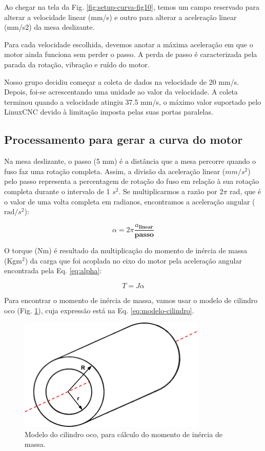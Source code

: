 Ao chegar na tela da Fig. \ref{fig:setup-curva-fig10}, temos um campo reservado para alterar a velocidade linear (mm/s) e outro para alterar a aceleração linear (mm/s2) da mesa deslizante.

Para cada velocidade escolhida, devemos anotar a máxima aceleração em que o motor ainda funciona sem perder o passo. A perda de passo é caracterizada pela parada da rotação, vibração e ruído do motor. 

Nosso grupo decidiu começar a coleta de dados na velocidade de 20 mm/s. Depois, foi-se acrescentando uma unidade ao valor da velocidade. A coleta terminou quando a velocidade atingiu 37.5 mm/s, o máximo valor suportado pelo LinuxCNC devido à limitação imposta pelas suas portas paralelas.


\subsection{Processamento para gerar a curva do motor}

Na mesa deslizante, o passo (5 mm) é a distância que a mesa percorre quando o fuso faz uma rotação completa. Assim, a divisão da aceleração linear ($mm/s^2$) pelo passo representa a percentagem de rotação do fuso em relação à sua rotação completa durante o intervalo de 1 $s^2$. Se multiplicarmos a razão por $2\pi$ rad, que é o valor de uma volta completa em radianos, encontramos a aceleração angular ($\text{rad}/s^2$):

\begin{equation}
    \alpha = 2\pi \frac{a_{\textbf{linear}}}{\textbf{passo}}
    \label{eq:alpha}
\end{equation}

O torque (Nm) é resultado da multiplicação do momento de inércia de massa (Kgm$^2$) da carga que foi acoplada no eixo do motor pela aceleração angular encontrada pela Eq. \ref{eq:alpha}:

\begin{equation}
    T = J\alpha
    \label{eq:torque}
\end{equation}

Para encontrar o momento de inércia de massa, vamos usar o modelo de cilindro oco (Fig. \ref{fig:cilindro-oco}), cuja expressão está na Eq. \ref{eq:modelo-cilindro}. 

\begin{figure}
    \centering
    \includegraphics[width=0.6\linewidth]{images/Eletrica/Figura11.png}
    \caption{Modelo do cilindro oco, para cálculo do momento de inércia de massa.}
    \label{fig:cilindro-oco}
\end{figure}


